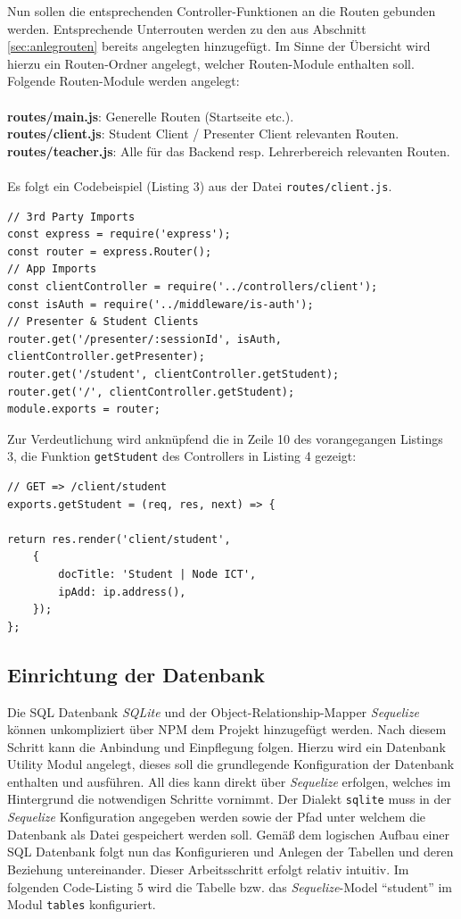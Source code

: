 Nun sollen die entsprechenden Controller-Funktionen an die Routen gebunden werden. Entsprechende Unterrouten werden zu den aus Abschnitt \ref{sec:anlegrouten} bereits angelegten hinzugefügt. Im Sinne der Übersicht wird hierzu ein Routen-Ordner angelegt, welcher Routen-Module enthalten soll. 
Folgende Routen-Module werden angelegt: \\ \\
\textbf{routes/main.js}: Generelle Routen (Startseite etc.). \\
\textbf{routes/client.js}: Student Client / Presenter Client relevanten Routen.\\
\textbf{routes/teacher.js}: Alle für das Backend resp. Lehrerbereich relevanten Routen.\\ \\
Es folgt ein Codebeispiel (Listing 3) aus der Datei \texttt{routes/client.js}. 
\begin{lstlisting}[caption=Unterrouten und Controlleranbindung]
// 3rd Party Imports
const express = require('express');
const router = express.Router();
// App Imports
const clientController = require('../controllers/client');
const isAuth = require('../middleware/is-auth');
// Presenter & Student Clients
router.get('/presenter/:sessionId', isAuth, clientController.getPresenter);
router.get('/student', clientController.getStudent);
router.get('/', clientController.getStudent);
module.exports = router;
\end{lstlisting}
\newpage
Zur Verdeutlichung wird anknüpfend die in Zeile 10 des vorangegangen Listings 3, die Funktion \texttt{getStudent} des Controllers in Listing 4 gezeigt:
\begin{lstlisting}[caption=GET Funktion des Student Controllers]
// GET => /client/student
exports.getStudent = (req, res, next) => {

return res.render('client/student',
	{
		docTitle: 'Student | Node ICT',
		ipAdd: ip.address(),
	});
};
\end{lstlisting}
 
 \subsection{Einrichtung der Datenbank}
 Die SQL Datenbank \emph{SQLite}  und der Object-Relationship-Mapper \emph{Sequelize} können unkompliziert über NPM dem Projekt hinzugefügt werden.  
 Nach diesem Schritt kann die Anbindung und Einpflegung folgen. Hierzu wird ein Datenbank Utility Modul angelegt, dieses soll die grundlegende Konfiguration der Datenbank enthalten und ausführen. All dies kann direkt über \emph{Sequelize} erfolgen, welches im Hintergrund die notwendigen Schritte vornimmt. Der Dialekt \texttt{sqlite} muss in der \emph{Sequelize} Konfiguration angegeben werden sowie der Pfad unter welchem die Datenbank als Datei gespeichert werden soll. Gemäß dem logischen Aufbau einer SQL Datenbank folgt nun das Konfigurieren und Anlegen der Tabellen und deren Beziehung untereinander. Dieser Arbeitsschritt erfolgt relativ intuitiv. Im folgenden Code-Listing 5  wird die Tabelle bzw. das \emph{Sequelize}-Model "`student"' im Modul \texttt{tables} konfiguriert.
 
